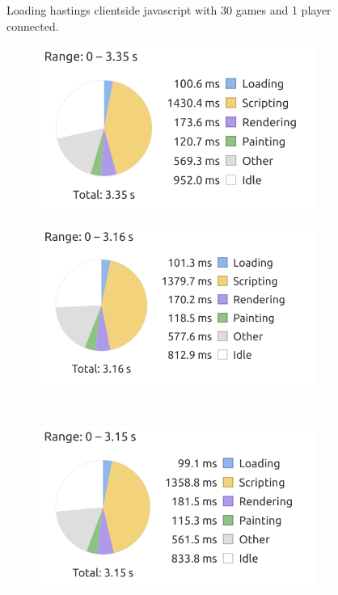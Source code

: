 \begin{figure}[h!]
    \caption{Loading hastings clientside javascript with 30 games and 1 player connected.}
    \label{fig:my_label}
\end{figure}

\begin{figure}[h!]
    \centering
    \begin{subfigure}{0.49\textwidth}
        \includegraphics[width=\textwidth]{figure/clientsidePerformance/graph90games1.png}
    \end{subfigure}
    \begin{subfigure}{0.49\textwidth}
        \includegraphics[width=\textwidth]{figure/clientsidePerformance/graph90games2.png}
    \end{subfigure}
    \\
    \begin{subfigure}{0.5\textwidth}
        \includegraphics[width=\textwidth]{figure/clientsidePerformance/graph90games3.png}
    \end{subfigure}
    

\end{figure}
